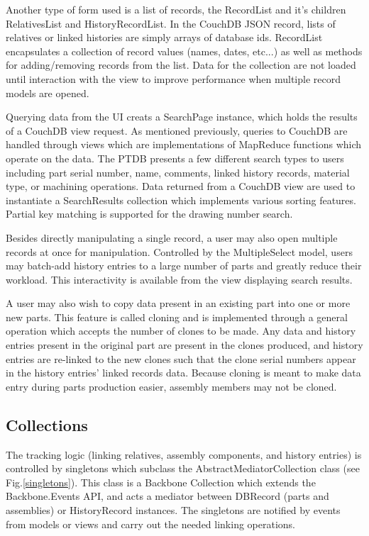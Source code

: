 \documentclass[journal]{IEEEtran}
\begin{document}
Another type of form used is a list of records, the RecordList and it's children RelativesList and HistoryRecordList. 
In the CouchDB JSON record, lists of relatives or linked histories are simply arrays of database ids.
RecordList encapsulates a collection of record values (names, dates, etc...)
as well as methods for adding/removing records from the list. Data for the collection are not loaded
until interaction with the view to improve performance when multiple record models are opened.

Querying data from the UI creats a SearchPage instance, which holds the results of a CouchDB view request.
As mentioned previously, queries to CouchDB are handled through views which are implementations of
MapReduce functions which operate on the data. The PTDB presents a few different search types to users including
part serial number, name, comments, linked history records, material type, or machining operations.
Data returned from a CouchDB view are used to instantiate a SearchResults collection which implements various
sorting features. Partial key matching is supported for the drawing number search.

Besides directly manipulating a single record, a user may also open multiple records at once for 
manipulation. Controlled by the MultipleSelect model, users may batch-add history entries to a
large number of parts and greatly reduce their workload. This interactivity is available from
the view displaying search results.

A user may also wish to copy data present in an existing part into one or more new parts. This
feature is called cloning and is implemented through a general operation which accepts the number
of clones to be made. Any data and history entries present in the original part are present in the
clones produced, and history entries are re-linked to the new clones such that the clone serial
numbers appear in the history entries' linked records data. Because cloning is meant to make
data entry during parts production easier, assembly members may not be cloned. 

\subsection{Collections}
The tracking logic (linking relatives, assembly components, and history entries) is controlled
by singletons which subclass the AbstractMediatorCollection class (see Fig.\ref{singletons}). This class is a Backbone Collection
which extends the Backbone.Events API, and acts a mediator between DBRecord (parts and assemblies) or
HistoryRecord instances. The singletons are notified by events from models or views and carry out the needed
linking operations.
\end{document}
